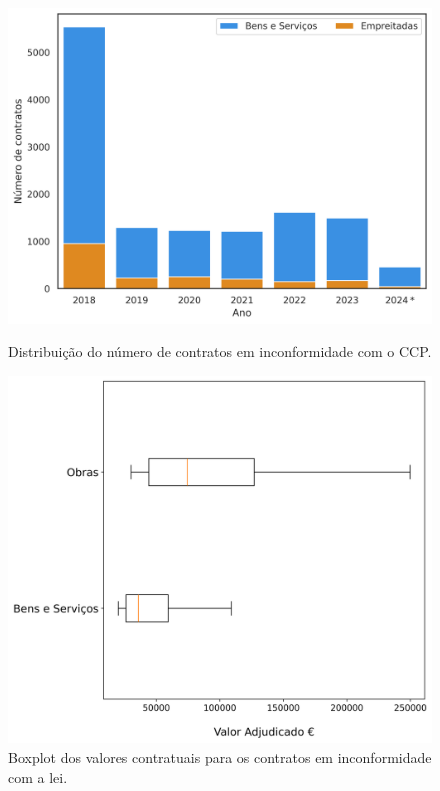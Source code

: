 \begin{figure}[H]
	\centering
	\begin{minipage}{.45\linewidth}
		\includegraphics[width=\linewidth]{imagens/rf1/dist.png}
		\caption{Distribuição do número de contratos em inconformidade com o CCP.}
		
	\end{minipage}
	\hfill
	\begin{minipage}{.5\linewidth}
		\includegraphics[width=\linewidth]{imagens/rf1/boxplot.png}
		\caption{Boxplot dos valores contratuais para os contratos em inconformidade com a lei.}
		\label{fig:boxaj}
	\end{minipage}
\end{figure}


